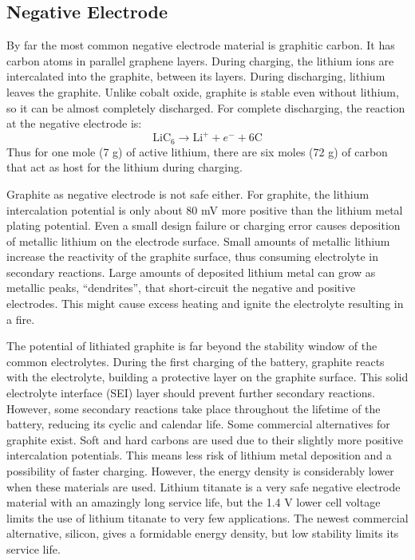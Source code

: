 \subsection{Negative Electrode}
\label{sec:negative-electrode}
By far the most common negative electrode material is graphitic carbon. It has carbon atoms in parallel graphene layers. During charging, the lithium ions are intercalated into the graphite, between its layers. During discharging, lithium leaves the graphite. Unlike cobalt oxide, graphite is stable even without lithium, so it can be almost completely discharged. For complete discharging, the reaction at the negative electrode is:
\begin{equation}
    \label{eq:negative-electrode}
    \text{LiC}_6 \rightarrow \text{Li}^+ + e^- + 6\text{C}
\end{equation}
Thus for one mole (7 g) of active lithium, there are six moles (72 g) of carbon that act as host for the lithium during charging.

Graphite as negative electrode is not safe either. For graphite, the lithium intercalation potential is only about 80 mV more positive than the lithium metal plating potential. Even a small design failure or charging error causes deposition of metallic lithium on the electrode surface. Small amounts of metallic lithium increase the reactivity of the graphite surface, thus consuming electrolyte in secondary reactions. Large amounts of deposited lithium metal can grow as metallic peaks, “dendrites”, that short-circuit the negative and positive electrodes. This might cause excess heating and ignite the electrolyte resulting in a fire.

The potential of lithiated graphite is far beyond the stability window of the common electrolytes. During the first charging of the battery, graphite reacts with the electrolyte, building a protective layer on the graphite surface. This solid electrolyte interface (SEI) layer should prevent further secondary reactions. However, some secondary reactions take place throughout the lifetime of the battery, reducing its cyclic and calendar life.
Some commercial alternatives for graphite exist. Soft and hard carbons are used due to their slightly more positive intercalation potentials. This means less risk of lithium metal deposition and a possibility of faster charging.
However, the energy density is considerably lower when these materials are used. Lithium titanate is a very safe negative electrode material with an amazingly long service life, but the 1.4 V lower cell voltage limits the use of lithium titanate to very few applications. The newest commercial alternative, silicon, gives a formidable energy density, but low stability limits its service life.

